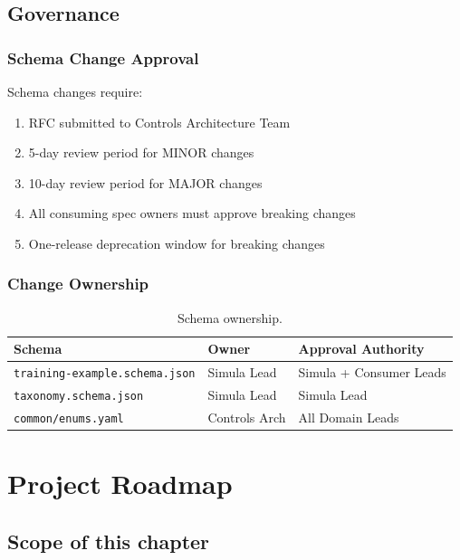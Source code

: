 \documentclass[12pt,a4paper,twoside]{report}
\begin{document}
\section{Governance}

\subsection{Schema Change Approval}

Schema changes require:

\begin{enumerate}
\item RFC submitted to Controls Architecture Team
\item 5-day review period for MINOR changes
\item 10-day review period for MAJOR changes
\item All consuming spec owners must approve breaking changes
\item One-release deprecation window for breaking changes
\end{enumerate}

\subsection{Change Ownership}

\begin{table}[htbp]
\centering
\caption{Schema ownership.}
\label{tab:schema-ownership}
\footnotesize
\begin{tabularx}{\textwidth}{@{}l l X@{}}
\toprule
\textbf{Schema} & \textbf{Owner} & \textbf{Approval Authority} \\
\midrule
\texttt{training-example.schema.json} & Simula Lead & Simula + Consumer Leads \\
\texttt{taxonomy.schema.json} & Simula Lead & Simula Lead \\
\texttt{common/enums.yaml} & Controls Arch & All Domain Leads \\
\bottomrule
\end{tabularx}
\end{table}
\chapter{Project Roadmap}\label{sec:sim-roadmap}

\section*{Scope of this chapter}
\end{document}
